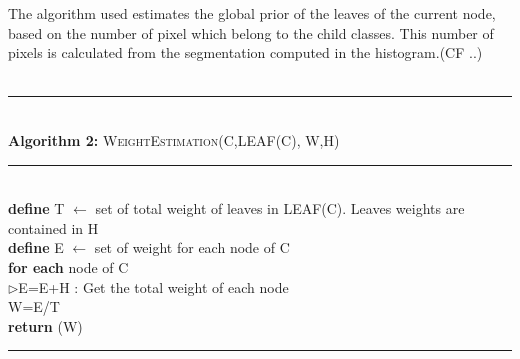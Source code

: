 The algorithm used estimates the global prior of the leaves of the current node, based on the number of pixel which belong to the child classes.
This number of pixels is calculated from the segmentation computed in the histogram.(CF ..)\\\\
%
\begin{minipage}{1\textwidth}
%
\hrule
\textbf{\\Algorithm 2:} \textsc{WeightEstimation}(C,LEAF(C), W,H)
\hrule
\textbf{\\define}  T $\leftarrow$ set of total weight of leaves in LEAF(C). Leaves weights are contained in H\\ 
\textbf{define}  E      $\leftarrow$ set of weight for each node of C\\ 
\textbf{for each}  node of C\\
$\triangleright$E=E+H : Get the total weight of each node\\
%
W=E/T\\
%
\textbf{return} (W)\\
\hrule
%
\end{minipage}
%

